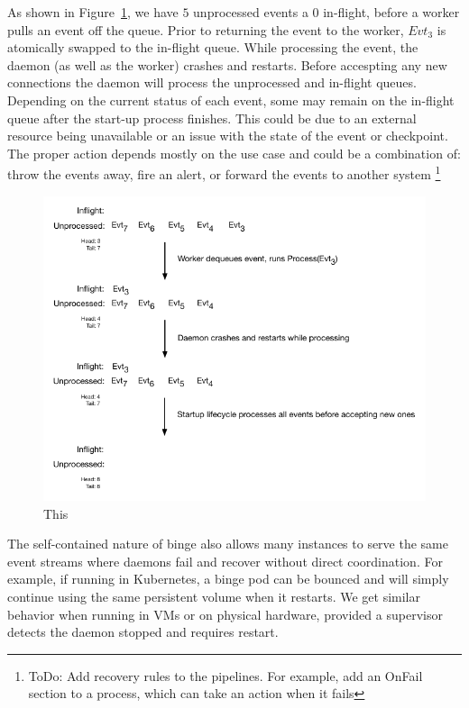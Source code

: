 \documentclass[10pt,twocolumn]{article}
\begin{document}
As shown in Figure~\ref{fig:durable-queue}, we have $5$ unprocessed events a
$0$ in-flight, before a worker pulls an event off the queue.  Prior to
returning the event to the worker, $Evt_{3}$ is atomically swapped to the
in-flight queue.  While processing the event, the daemon (as well as the
worker) crashes and restarts.  Before accespting any new connections the daemon
will process the unprocessed and in-flight queues.  Depending on the current
status of each event, some may remain on the in-flight queue after the start-up
process finishes.  This could be due to an external resource being unavailable
or an issue with the state of the event or checkpoint.  The proper action
depends mostly on the use case and could be a combination of: throw the events
away, fire an alert, or forward the events to another system \footnote{ToDo:
Add recovery rules to the pipelines.  For example, add an OnFail section to a
process, which can take an action when it fails}

\begin{figure}[h]
\centering
\includegraphics[scale=0.60]{figures/durable-queue.pdf}
\caption{This}
\label{fig:durable-queue}
\end{figure}

The self-contained nature of binge also allows many instances to serve the same
event streams where daemons fail and recover without direct coordination.  For
example, if running in Kubernetes, a binge pod can be bounced and will simply
continue using the same persistent volume when it restarts.  We get similar
behavior when running in VMs or on physical hardware, provided a supervisor
detects the daemon stopped and requires restart.
\end{document}
